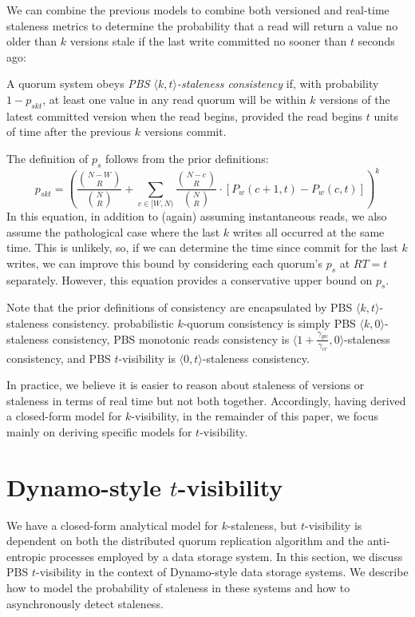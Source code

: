 \documentclass{vldb}
\newcommand{\sectionskip}{-0em}
\begin{document}
We can combine the previous models to combine both versioned and
real-time staleness metrics to determine the probability that a read
will return a value no older than $k$ versions stale if the last write
committed no sooner than $t$ seconds ago:
\begin{definition}
A quorum system obeys \textit{PBS $\langle k, t \rangle$-staleness
  consistency} if, with probability $1-p_{skt}$, at least one value in
any read quorum will be within $k$ versions of the latest committed
version when the read begins, provided the read begins $t$ units of
time after the previous $k$ versions commit.
\end{definition}
The definition of $p_{s}$ follows from the prior definitions:
\begin{equation}
p_{skt} = (\frac{{N-W \choose R}}{{N \choose R}}+\sum_{c\in[W, N)} \frac{{N-c \choose R}}{{N \choose R}} \cdot [P_w(c+1, t)-P_w(c,t)])^k
\end{equation}
In this equation, in addition to (again) assuming instantaneous reads,
we also assume the pathological case where the last $k$ writes all
occurred at the same time.  This is unlikely, so, if we can determine
the time since commit for the last $k$ writes, we can improve this
bound by considering each quorum's $p_{s}$ at $RT=t$ separately.
However, this equation provides a conservative upper bound on $p_{s}$.

Note that the prior definitions of consistency are encapsulated by PBS
$\langle k, t \rangle$-staleness consistency. probabilistic $k$-quorum
consistency is simply PBS $\langle k, 0 \rangle$-staleness consistency,
PBS monotonic reads consistency is $\langle
1+\frac{\gamma_{gw}}{\gamma_{cr}}, 0 \rangle$-staleness consistency, and
PBS $t$-visibility is $\langle 0, t \rangle$-staleness consistency.

In practice, we believe it is easier to reason about staleness of
versions or staleness in terms of real time but not both together.
Accordingly, having derived a closed-form model for $k$-visibility, in
the remainder of this paper, we focus mainly on deriving specific models
for $t$-visibility.

\vspace{\sectionskip}\section{Dynamo-style $t$-visibility}
\label{sec:dynamo}

We have a closed-form analytical model for $k$-staleness, but
$t$-visibility is dependent on both the distributed quorum replication
algorithm and the anti-entropic processes employed by a data storage
system.  In this section, we discuss PBS $t$-visibility in the context
of Dynamo-style data storage systems.  We describe how to model the
probability of staleness in these systems and how to asynchronously
detect staleness.
\end{document}
